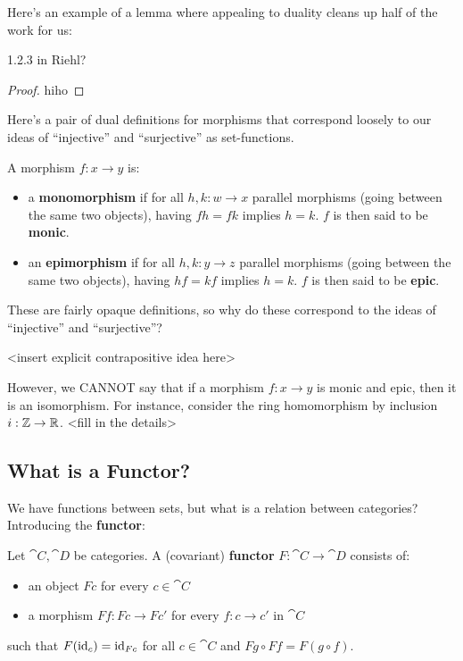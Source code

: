 Here's an example of a lemma where appealing to duality cleans up half of the work for us:
\begin{lemma}
  1.2.3 in Riehl?
\end{lemma}
\begin{proof}
  hiho
\end{proof}

Here's a pair of dual definitions for morphisms that correspond loosely to our ideas of ``injective'' and ``surjective'' as set-functions.
\begin{definition}
  A morphism $f : x \to y$ is:
  \begin{itemize}
    \item a \textbf{monomorphism} if for all $h, k : w \to x$ parallel morphisms (going between the same two objects), having $fh = fk$ implies $h = k$. $f$ is then said to be \textbf{monic}.
    \item an \textbf{epimorphism} if for all $h, k : y \to z$ parallel morphisms (going between the same two objects), having $hf = kf$ implies $h = k$. $f$ is then said to be \textbf{epic}.
  \end{itemize}
\end{definition}
These are fairly opaque definitions, so why do these correspond to the ideas of ``injective'' and ``surjective''?

<insert explicit contrapositive idea here>

However, we CANNOT say that if a morphism $f : x \to y$ is monic and epic, then it is an isomorphism. For instance, consider the ring homomorphism by inclusion $i : \mathbb Z \to \mathbb R$. <fill in the details>

\subsection{What is a Functor?}
We have functions between sets, but what is a relation between categories? Introducing the \textbf{functor}:
\begin{definition}[Functor]
  Let $\cat C, \cat D$ be categories. A (covariant) \textbf{functor} $F : \cat C \to \cat D$ consists of:
  \begin{itemize}
    \item an object $Fc$ for every $c \in \cat C$
    \item a morphism $Ff : Fc \to Fc'$ for every $f : c \to c'$ in $\cat C$
  \end{itemize}
  such that $F(\mathrm{id}_c) = \mathrm{id}_{Fc}$ for all $c \in \cat C$ and $Fg \circ Ff = F(g \circ f)$.
\end{definition}

